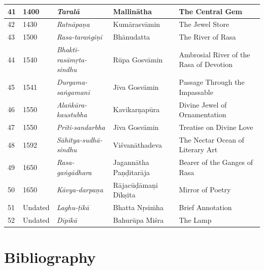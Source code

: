 \begin{longtable}{|l|p{1.1cm}|p{1.98cm}|p{1.98cm}|p{1.98cm}|}
\hline
41 & 1400 & \textit{Taralā} & Mallinātha & The Central Gem \\
\hline
42 & 1430 & \textit{Ratnāpaṇa} & Kumārasvāmin & The Jewel Store \\
\hline
43 & 1500 & \textit{Rasa-taraṅgiṇī} & Bhānudatta & The River of Rasa \\
\hline
44 & 1540 & \textit{Bhakti-rasāmṛta-sindhu} & Rūpa Gosvāmin & Ambrosial River of the Rasa of Devotion \\
\hline
45 & 1541 & \textit{Durgama-saṅgamanī} & Jīva Gosvāmin & Passage Through the Impassable \\
\hline
46 & 1550 & \textit{Alaṅkāra-kaustubha} & Kavikarṇapūra & Divine Jewel of Ornamentation \\
\hline
47 & 1550 & \textit{Prīti-sandarbha} & Jīva Gosvāmin & Treatise on Divine Love \\
\hline
48 & 1592 & \textit{Sāhitya-sudhā-sindhu} & Viśvanātha\-deva & The Nectar Ocean of Literary Art \\
\hline
49 & 1650 & \textit{Rasa-gaṅgādhara} & Jagannātha Paṇḍitarāja & Bearer of the Ganges of Rasa \\
\hline
50 & 1650 & \textit{Kāvya-darpaṇa} & Rājacūḍāmaṇi Dīkṣita & Mirror of Poetry \\
\hline
51 & Undated & \textit{Laghu-ṭīkā} & Bhatta Nṛsiṁha & Brief Annotation \\
\hline
52 & Undated & \textit{Dīpikā} & Bahurūpa Miśra & The Lamp \\
\hline
\end{longtable}


\section*{Bibliography}

